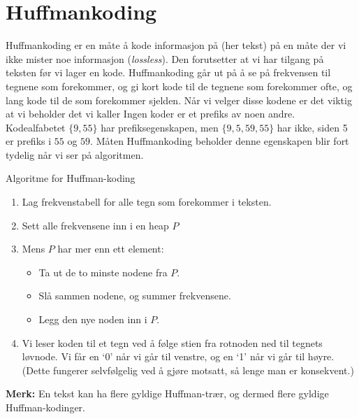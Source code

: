 \section{Huffmankoding}\label{huffman}
Huffmankoding er en måte å kode informasjon på (her tekst) på en måte der vi ikke mister noe informasjon (\textit{lossless}). Den forutsetter at vi har tilgang på teksten før vi lager en kode. Huffmankoding går ut på å se på frekvensen til tegnene som forekommer, og gi kort kode til de tegnene som forekommer ofte, og lang kode til de som forekommer sjelden. Når vi velger disse kodene er det viktig at vi beholder det vi kaller  Ingen koder er et prefiks av noen andre. Kodealfabetet $ \{9, 55\} $ har prefiksegenskapen, men $ \{9, 5, 59, 55\} $ har ikke, siden 5 er prefiks i $ 55 $ og $ 59 $. Måten Huffmankoding beholder denne egenskapen blir fort tydelig når vi ser på algoritmen. 

\begin{theorem} Algoritme for Huffman-koding

\begin{enumerate}
	\item Lag frekvenstabell for alle tegn som forekommer i teksten.
	\item Sett alle frekvensene inn i en heap $ P $
	\item Mens $P$ har mer enn ett element:
	\begin{itemize}
		\item Ta ut de to minste nodene fra $P$.	
		\item Slå sammen nodene, og summer frekvensene.
		\item Legg den nye noden inn i $P$.	
	\end{itemize}
	\item Vi leser koden til et tegn ved å følge stien fra rotnoden ned til tegnets løvnode. Vi får en `0' når vi går til venstre, og en `1' når vi går til høyre. (Dette fungerer selvfølgelig ved å gjøre motsatt, så lenge man er konsekvent.) 
\end{enumerate}
\end{theorem}

\noindent \textbf{Merk:} En tekst kan ha flere gyldige Huffman-trær, og dermed flere gyldige Huffman-kodinger. 

~\\

